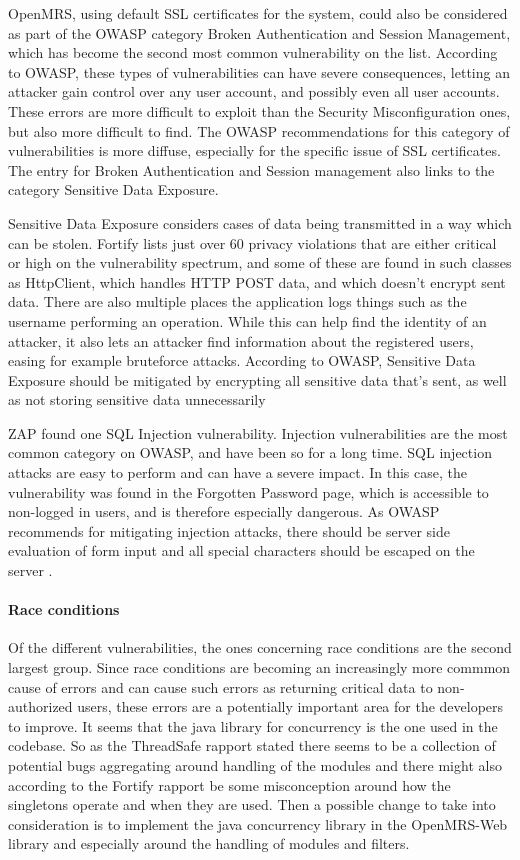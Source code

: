 \documentclass{report} %
\begin{document}
OpenMRS, using default SSL certificates for the system, could also be considered
as part of the OWASP category Broken Authentication and Session Management,
which has become the second most common vulnerability on the list. According to
OWASP, these types of vulnerabilities can have severe consequences, letting an
attacker gain control over any user account, and possibly even all user accounts.
These errors are more difficult to exploit than the Security Misconfiguration
ones, but also more difficult to find. The OWASP recommendations for this
category of vulnerabilities is more diffuse, especially for the specific issue
of SSL certificates. The entry for Broken Authentication and Session management
also links to the category Sensitive Data Exposure.

Sensitive Data Exposure considers cases of data being transmitted in a way which
can be stolen. Fortify lists just over 60 privacy violations that are either critical
or high on the vulnerability spectrum, and some of these are found in such
classes as HttpClient, which handles HTTP POST data, and which doesn't encrypt sent
data. There are also multiple places the application logs things such as the
username performing an operation. While this can help find the identity of
an attacker, it also lets an attacker find information about the registered
users, easing for example bruteforce attacks.
According to OWASP, Sensitive Data Exposure should be mitigated by encrypting
all sensitive data that's sent, as well as not storing sensitive data
unnecessarily

ZAP found one SQL Injection vulnerability. Injection vulnerabilities are the
most common category on OWASP, and have been so for a long time. SQL injection
attacks are easy to perform and can have a severe impact. In this case, the
vulnerability was found in the Forgotten Password page, which is accessible to
non-logged in users, and is therefore especially dangerous. As OWASP recommends
for mitigating injection attacks, there should be server side evaluation of form
input and all special characters should be escaped on the server \autocite[]{owasptop10}.


\paragraph{Race conditions}
Of the different vulnerabilities, the ones concerning race conditions are 
the second largest group. Since race conditions are becoming an increasingly
more commmon cause of errors and can cause such errors as returning critical
data to non-authorized users, these errors are a potentially important area for
the developers to improve. It seems that the java library for concurrency is the
one used in the codebase. So as the ThreadSafe rapport stated there seems to be
a collection of potential bugs aggregating around handling of the modules and
there might also according to the Fortify rapport be some misconception around
how the singletons operate and when they are used. Then a possible change to take
into consideration is to implement the java concurrency library in the
OpenMRS-Web library and especially around the handling of modules and filters. 
\end{document}
